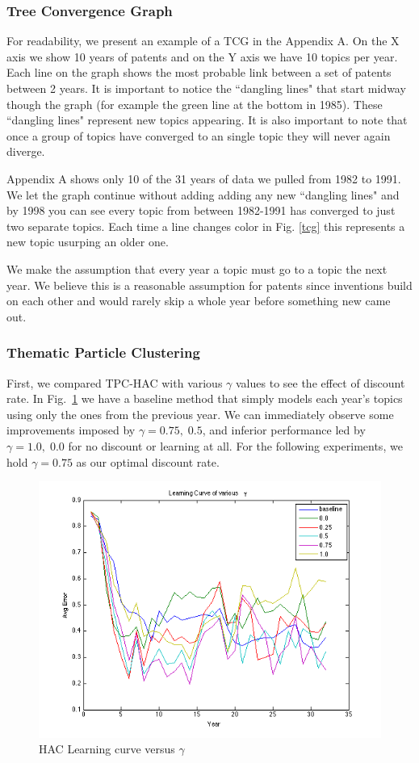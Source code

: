 \documentclass[conference]{IEEEtran}
\begin{document}
\subsubsection{Tree Convergence Graph}
For readability, we  present an example of a TCG in the Appendix A. On the X axis we show 10 years of patents and on the Y axis we have 10 topics per year. Each line on the graph shows the most probable link between a set of patents between 2 years. It is important to notice the ``dangling lines" that start midway though the graph (for example the green line at the bottom in 1985). These ``dangling lines" represent new topics appearing. It is also important to note that once a group of topics have converged to an single topic they will never again diverge. 

Appendix A shows only 10 of the 31 years of data we pulled from 1982 to 1991. We let the graph continue without adding adding any new ``dangling lines" and  by 1998 you can see every topic from between 1982-1991 has converged to just two separate topics. Each time a line changes color in Fig. \ref{tcg} this represents a new topic usurping an older one.

We make the assumption that every year a topic must go to a topic the next year. We believe this is a reasonable assumption for patents since inventions build on each other and would rarely skip a whole year before something new came out.

\subsubsection{Thematic Particle Clustering}

First, we compared TPC-HAC with various $\gamma$ values to see the effect of discount rate. In Fig.~\ref{hac_gamma} we have a baseline method that simply models each year's topics using only the ones from the previous year. We can immediately observe some improvements imposed by $\gamma=0.75,\;0.5$, and inferior performance led by $\gamma=1.0,\;0.0$ for no discount or learning at all. For the following experiments, we hold $\gamma=0.75$ as our optimal discount rate.

\begin{figure}[h]
	\center
	\includegraphics[width=.50\textwidth]{fig/hac_gamma.png}
	\caption{HAC Learning curve versus $\gamma$}
	\label{hac_gamma}
\end{figure}
\end{document}

